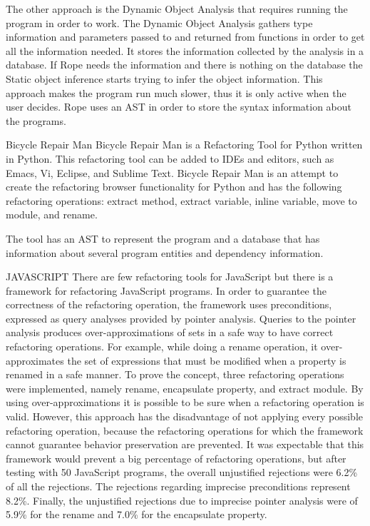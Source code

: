 The other approach is the Dynamic Object Analysis that requires running
the program in order to work.
The Dynamic Object Analysis gathers type information and parameters passed to and returned from
functions in order to get all the information needed.
It stores the information collected by the analysis in a database.
If Rope needs the information and there is nothing on the database the Static
object inference starts trying to infer the object information.
This approach makes the program run much slower, thus it is only active when
the user decides.%
Rope uses an AST in order to store the syntax information about the programs.


Bicycle Repair Man
Bicycle Repair Man is a Refactoring Tool for Python written in Python.
 This refactoring tool can be added to IDEs and editors, such as Emacs, Vi, Eclipse,
  and Sublime Text.
Bicycle Repair Man is an attempt to create the refactoring browser functionality for
 Python and has the following refactoring operations:
 extract method, extract variable, inline variable, move to module, and rename.

The tool has an AST to represent the program and a database that has information
about several program entities and dependency information.

JAVASCRIPT
There are few refactoring tools for JavaScript but there is a framework
\cite{feldthaus2011tool} for refactoring JavaScript programs. %
In order to guarantee the correctness of the refactoring operation, the framework
uses preconditions, expressed as query analyses provided by pointer analysis. %
Queries to the pointer analysis produces over-approximations of sets in a safe way to
have correct refactoring operations.
For example, while doing a rename operation, it over-approximates the set of expressions
that must be modified when a property is renamed in a safe manner.
To prove the concept, three refactoring operations were implemented, namely rename,
encapsulate property, and extract module.
By using over-approximations it is possible to be sure when a refactoring
operation is valid.
However, this approach has the disadvantage of not applying every possible refactoring operation,
because the refactoring operations for which the framework cannot guarantee behavior
preservation are prevented.%
It was expectable that this framework would prevent a big percentage of refactoring
operations, but after testing with 50 JavaScript programs,
the overall unjustified rejections were 6.2\% of all the rejections.
The rejections regarding imprecise preconditions represent 8.2\%.
Finally, the unjustified rejections due to imprecise pointer analysis were of
5.9\% for the rename and 7.0\% for the encapsulate property.

